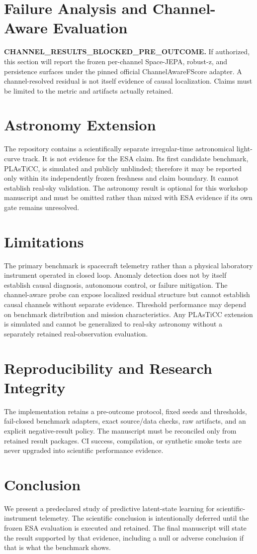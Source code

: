 \documentclass[conference]{IEEEtran}
\begin{document}
\section{Failure Analysis and Channel-Aware Evaluation}
\textbf{CHANNEL\_RESULTS\_BLOCKED\_PRE\_OUTCOME.} If authorized, this section will report the frozen per-channel Space-JEPA, robust-z, and persistence surfaces under the pinned official ChannelAwareFScore adapter. A channel-resolved residual is not itself evidence of causal localization. Claims must be limited to the metric and artifacts actually retained.

\section{Astronomy Extension}
The repository contains a scientifically separate irregular-time astronomical light-curve track. It is not evidence for the ESA claim. Its first candidate benchmark, PLAsTiCC, is simulated and publicly unblinded; therefore it may be reported only within its independently frozen freshness and claim boundary. It cannot establish real-sky validation. The astronomy result is optional for this workshop manuscript and must be omitted rather than mixed with ESA evidence if its own gate remains unresolved.

\section{Limitations}
The primary benchmark is spacecraft telemetry rather than a physical laboratory instrument operated in closed loop. Anomaly detection does not by itself establish causal diagnosis, autonomous control, or failure mitigation. The channel-aware probe can expose localized residual structure but cannot establish causal channels without separate evidence. Threshold performance may depend on benchmark distribution and mission characteristics. Any PLAsTiCC extension is simulated and cannot be generalized to real-sky astronomy without a separately retained real-observation evaluation.

\section{Reproducibility and Research Integrity}
The implementation retains a pre-outcome protocol, fixed seeds and thresholds, fail-closed benchmark adapters, exact source/data checks, raw artifacts, and an explicit negative-result policy. The manuscript must be reconciled only from retained result packages. CI success, compilation, or synthetic smoke tests are never upgraded into scientific performance evidence.

\section{Conclusion}
We present a predeclared study of predictive latent-state learning for scientific-instrument telemetry. The scientific conclusion is intentionally deferred until the frozen ESA evaluation is executed and retained. The final manuscript will state the result supported by that evidence, including a null or adverse conclusion if that is what the benchmark shows.
\end{document}
